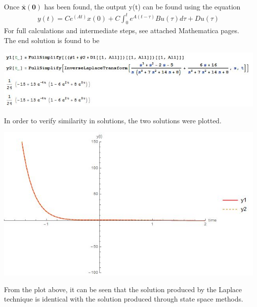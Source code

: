 \documentclass[paper=a4, fontsize=11pt]{scrartcl} %
\numberwithin{equation}{section} %
\numberwithin{figure}{section} %
\numberwithin{table}{section} %
\begin{document}
\begin{section}
\begin{align}
\end{align}
Once $\boldsymbol{\bar{x}(0)}$ has been found, the output y(t) can be found using the equation
\begin{align}
y(t)=Ce^{(At)}x(0)+C\int_{0}^{t} e^{A(t-\tau)}Bu(\tau)d\tau+Du(\tau)
\end{align}
For full calculations and intermediate steps, see attached Mathematica pages.  The end solution is found to be 
\begin{center}
\includegraphics{Image10}
\end{center}
In order to verify similarity in solutions, the two solutions were plotted.
\begin{center}
\includegraphics{Image11}
\end{center}
From the plot above, it can be seen that the solution produced by the Laplace technique is identical with the solution produced through state space methods.
\end{section}


\end{document}
